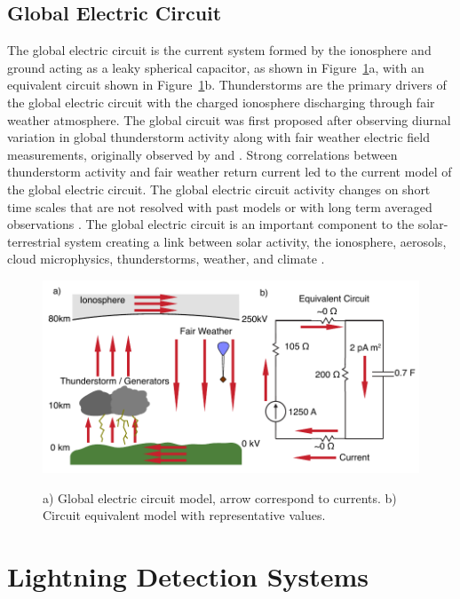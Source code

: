 \subsection{Global Electric Circuit}

The global electric circuit is the current system formed by the ionosphere and ground acting as a leaky spherical capacitor, as shown in Figure~\ref{intro:fig:gec}a, with an equivalent circuit shown in Figure~\ref{intro:fig:gec}b.
Thunderstorms are the primary drivers of the global electric circuit with the charged ionosphere discharging through fair weather atmosphere.
The global circuit was first proposed after observing diurnal variation in global thunderstorm activity along with fair weather electric field measurements, originally observed by \citet{Wilson1921} and \citet{Whipple1929}.
Strong correlations between thunderstorm activity and fair weather return current led to the current model of the global electric circuit.
The global electric circuit activity changes on short time scales that are not resolved with past models or with long term averaged observations \citep{Holzworth1984a}.
The global electric circuit is an important component to the solar-terrestrial system creating a link between solar activity, the ionosphere, aerosols, cloud microphysics, thunderstorms, weather, and climate \citep{Tinsley2007, Holzworth1986}.

\begin{figure}[ht!]
	\centering
	\includegraphics[scale=1]{Introduction/Figures/global_circuit.pdf}\\
	\caption{a) Global electric circuit model, arrow correspond to currents.
			b) Circuit equivalent model with representative values.}
	\label{intro:fig:gec}
\end{figure}

\section{Lightning Detection Systems}

